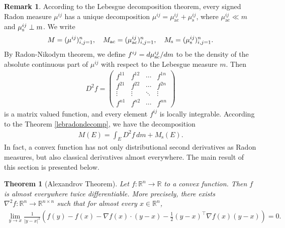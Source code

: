 \documentclass{article}
\numberwithin{equation}{section}
\newcommand{\bbR}{\mathbb{R}}
\theoremstyle{plain}
\newtheorem{theorem}{Theorem}[section]
\theoremstyle{definition}
\newtheorem*{remark}{Remark}
\begin{document}
\begin{remark} 
	According to the Lebesgue decomposition theorem, every signed Radon measure $\mu^{ij}$ has a unique decomposition $\mu^{ij}=\mu^{ij}_\mathrm{ac}+\mu^{ij}_\mathrm{s}$, where $\mu_\mathrm{ac}^{ij}\ll m$ and $\mu_{\rm s}^{ij}\perp m$. We write
	\begin{align*}
		M=(\mu^{ij})_{i,j=1}^n,\quad M_\mathrm{ac}=(\mu^{ij}_\mathrm{ac})_{i,j=1}^n,\quad M_{\rm s}=(\mu^{ij}_{\rm s})_{i,j=1}^n.
	\end{align*}
	By Radon-Nikodym theorem, we define $f^{ij}=d\mu_{\rm ac}^{ij}/dm$ to be the density of the absolute continuous part of $\mu^{ij}$ with respect to the Lebesgue measure $m$. Then
	\begin{align*}
		D^2f=\begin{pmatrix}
			f^{11} & f^{12} & \cdots & f^{1n}\\
			f^{21} & f^{22} & \cdots & f^{2n}\\
			\vdots & \vdots & \ddots & \vdots\\
			f^{n1} & f^{n2} & \cdots & f^{nn}
		\end{pmatrix}
	\end{align*}
	is a matrix valued function, and every element $f^{ij}$ is locally integrable. According to the Theorem \ref{lebradondecomp}, we have the decomposition
	\begin{align*}
		M(E)=\int_E D^2f\,dm+M_\mathrm{s}(E).
	\end{align*}
In fact, a convex function has not only distributional second derivatives as Radon measures, but also classical derivatives almost everywhere.  The main result of this section is presented below.
\end{remark}
\begin{theorem}[Alexandrov Theorem]\label{alexandrov}
	Let $f:\bbR^n\to\bbR$ to a convex function. Then $f$ is almost everywhere twice differentiable. More precisely, there exists $\nabla^2f:\bbR^n\to\bbR^{n\times n}$ such that for almost every $x\in\bbR^n$,
	\begin{align}
		\lim_{y\to x}\frac{1}{\vert y-x\vert^2}\left(f(y)-f(x)-\nabla f(x)\cdot (y-x)-\frac{1}{2}(y-x)^\top\nabla f(x)(y-x)\right)=0.\label{alexandrovapprox}
	\end{align}
\end{theorem}
\end{document}
